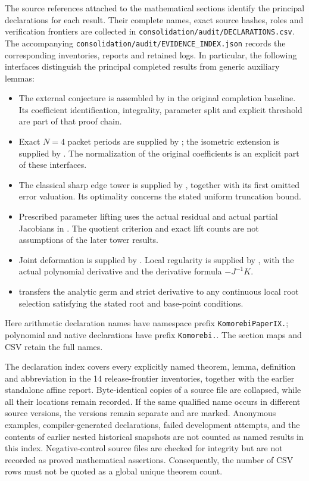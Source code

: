 The source references attached to the mathematical sections identify the
principal declarations for each result. Their complete names, exact source
hashes, roles and verification frontiers are collected in
\texttt{consolidation/audit/DECLARATIONS.csv}. The accompanying
\texttt{consolidation/audit/EVIDENCE\_INDEX.json} records the corresponding inventories,
reports and retained logs. In particular, the following interfaces distinguish
the principal completed results from generic auxiliary lemmas:
\begin{itemize}
\item The external conjecture is assembled by
 in the original completion
baseline. Its coefficient identification, integrality, parameter split and
explicit threshold are part of that proof chain.
\item Exact $N=4$ packet periods are supplied by
; the isometric extension
is supplied by . The
normalization of the original coefficients is an explicit part of these
interfaces.
\item The classical sharp edge tower is supplied by
, together with its
first omitted error valuation. Its optimality concerns the stated uniform
truncation bound.
\item Prescribed parameter lifting uses the actual residual and actual
partial Jacobians in
.
The quotient criterion and exact lift counts are not assumptions of the
later tower results.
\item Joint deformation is supplied by
.
Local regularity is supplied by
, with the
actual polynomial derivative and the derivative formula $-J^{-1}K$.
\item {}
transfers the analytic germ and strict derivative to any continuous local
root selection satisfying the stated root and base-point conditions.
\end{itemize}
Here arithmetic declaration names have namespace prefix
\texttt{KomorebiPaperIX.}; polynomial and native declarations have prefix
\texttt{Komorebi.}. The section maps and CSV retain the full names.

The declaration index covers every explicitly named theorem, lemma,
definition and abbreviation in the 14 release-frontier inventories, together
with the earlier standalone affine report. Byte-identical copies of a source
file are collapsed, while all their locations remain recorded. If the same
qualified name occurs in different source versions, the versions remain
separate and are marked. Anonymous examples, compiler-generated declarations,
failed development attempts, and the contents of earlier nested historical
snapshots are not counted as named results in this index. Negative-control
source files are checked for integrity but are not recorded as proved
mathematical assertions. Consequently, the number of CSV rows must not be
quoted as a global unique theorem count.


